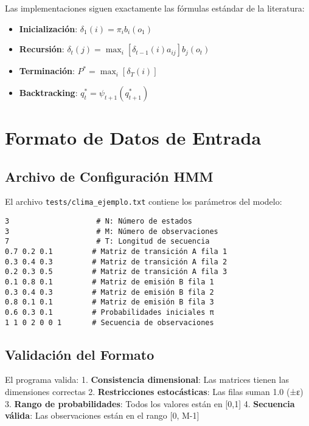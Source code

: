 \documentclass[
]{article}
\providecommand{\tightlist}{%
  \setlength{\itemsep}{0pt}\setlength{\parskip}{0pt}}
\begin{document}
Las implementaciones siguen exactamente las fórmulas estándar de la
literatura:

\begin{itemize}
\tightlist
\item
  \textbf{Inicialización}: \(\delta_1(i) = \pi_i b_i(o_1)\)
\item
  \textbf{Recursión}:
  \(\delta_t(j) = \max_i[\delta_{t-1}(i) a_{ij}] b_j(o_t)\)
\item
  \textbf{Terminación}: \(P^* = \max_i[\delta_T(i)]\)
\item
  \textbf{Backtracking}: \(q_t^* = \psi_{t+1}(q_{t+1}^*)\)
\end{itemize}

\section{Formato de Datos de Entrada}\label{formato-de-datos-de-entrada}

\subsection{Archivo de Configuración
HMM}\label{archivo-de-configuraciuxf3n-hmm}

El archivo \texttt{tests/clima\_ejemplo.txt} contiene los parámetros del
modelo:

\begin{verbatim}
3                    # N: Número de estados
3                    # M: Número de observaciones  
7                    # T: Longitud de secuencia
0.7 0.2 0.1         # Matriz de transición A fila 1
0.3 0.4 0.3         # Matriz de transición A fila 2
0.2 0.3 0.5         # Matriz de transición A fila 3
0.1 0.8 0.1         # Matriz de emisión B fila 1
0.3 0.4 0.3         # Matriz de emisión B fila 2
0.8 0.1 0.1         # Matriz de emisión B fila 3
0.6 0.3 0.1         # Probabilidades iniciales π
1 1 0 2 0 0 1       # Secuencia de observaciones
\end{verbatim}

\subsection{Validación del Formato}\label{validaciuxf3n-del-formato}

El programa valida: 1. \textbf{Consistencia dimensional}: Las matrices
tienen las dimensiones correctas 2. \textbf{Restricciones estocásticas}:
Las filas suman 1.0 (±ε) 3. \textbf{Rango de probabilidades}: Todos los
valores están en {[}0,1{]} 4. \textbf{Secuencia válida}: Las
observaciones están en el rango {[}0, M-1{]}
\end{document}
